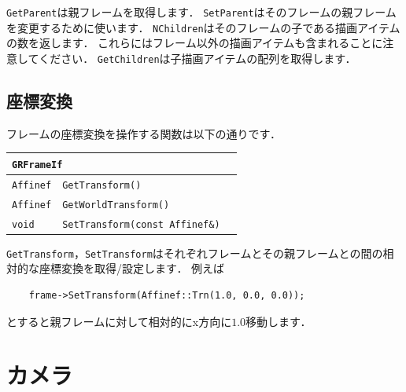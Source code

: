 \texttt{GetParent}は親フレームを取得します．
\texttt{SetParent}はそのフレームの親フレームを変更するために使います．
\texttt{NChildren}はそのフレームの子である描画アイテムの数を返します．
\KLUDGE これらにはフレーム以外の描画アイテムも含まれることに注意してください．
\texttt{GetChildren}は子描画アイテムの配列を取得します．


\subsection*{座標変換}

\KLUDGE フレームの座標変換を操作する関数は以下の通りです．

\begin{center}
\begin{tabular}{p{.15\hsize}p{.45\hsize}p{.3\hsize}}
\multicolumn{3}{l}{\texttt{GRFrameIf}}							\\ \midrule
\texttt{Affinef} & \texttt{GetTransform()}					& 	\\
\texttt{Affinef} & \texttt{GetWorldTransform()}				& 	\\
\texttt{void}	 & \texttt{SetTransform(const Affinef\&)}	& 	\\
\end{tabular}
\end{center}

\texttt{GetTransform}，\texttt{SetTransform}はそれぞれフレームとその親フレームとの間の相対的な座標変換を取得/設定します．
\KLUDGE 例えば
\begin{verbatim}
    frame->SetTransform(Affinef::Trn(1.0, 0.0, 0.0));
\end{verbatim}
\KLUDGE とすると親フレームに対して相対的にx方向に$1.0$移動します．

\section{カメラ}


